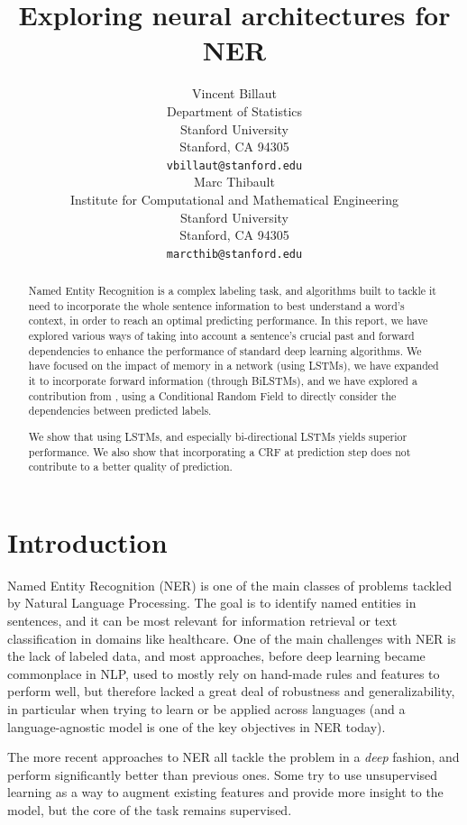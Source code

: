 \documentclass{article} %
\title{Exploring neural architectures for NER}
\author{
Vincent Billaut\\
Department of Statistics\\
Stanford University\\
Stanford, CA 94305 \\
\texttt{vbillaut@stanford.edu} \\
\And
Marc Thibault \\
Institute for Computational and Mathematical Engineering \\
Stanford University\\
Stanford, CA 94305 \\
\texttt{marcthib@stanford.edu} \\
}
\begin{document}
\maketitle

\begin{abstract}

Named Entity Recognition is a complex labeling task, and algorithms built to tackle it need to incorporate the whole sentence information to best understand a word's context, in order to reach an optimal predicting performance. In this report, we have explored various ways of taking into account a sentence's crucial past and forward dependencies to enhance the performance of standard deep learning algorithms. We have focused on the impact of memory in a network (using LSTMs), we have expanded it to incorporate forward information (through BiLSTMs), and we have explored a contribution from \cite{lample2016neural}, using a Conditional Random Field to directly consider the dependencies between predicted labels.

We show that using LSTMs, and especially bi-directional LSTMs yields superior performance. We also show that incorporating a CRF at prediction step does not contribute to a better quality of prediction. 
\end{abstract}

\section{Introduction}

Named Entity Recognition (NER) is one of the main classes of problems tackled by Natural Language Processing. The goal is to identify named entities in sentences, and it can be most relevant for information retrieval or text classification in domains like healthcare.
One of the main challenges with NER is the lack of labeled data, and
most approaches, before deep learning became commonplace in NLP, used to mostly rely on hand-made rules and features to perform well, but therefore lacked a great deal of robustness and generalizability, in particular when trying to learn or be applied across languages (and a language-agnostic model is one of the key objectives in NER today).

The more recent approaches to NER all tackle the problem in a \textit{deep} fashion, and perform significantly better than previous ones. Some try to use unsupervised learning as a way to augment existing features and provide more insight to the model, but the core of the task remains supervised.
\end{document}
